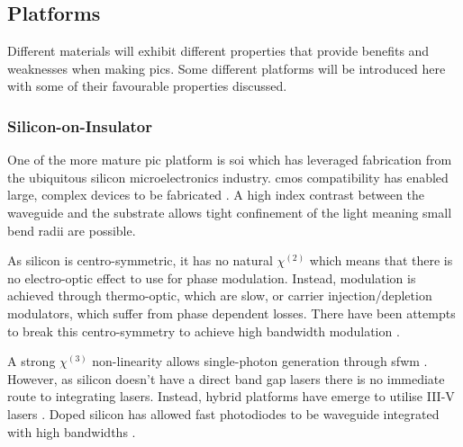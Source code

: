 

\subsection{Platforms}

Different materials will exhibit different properties that provide benefits and weaknesses when making \acp{pic}. Some different platforms will be introduced here with some of their favourable properties discussed.

\subsubsection*{Silicon-on-Insulator}

One of the more mature \ac{pic} platform is \ac{soi} which has leveraged fabrication from the ubiquitous silicon microelectronics industry. \Ac{cmos} compatibility has enabled large, complex devices to be fabricated \cite{wang2019integrated}. A high index contrast between the waveguide and the substrate allows tight confinement of the light meaning small bend radii are possible. 

As silicon is centro-symmetric, it has no natural $\chi^{(2)}$ which means that there is no electro-optic effect to use for phase modulation. Instead, modulation is achieved through thermo-optic, which are slow, or carrier injection/depletion modulators, which suffer from phase dependent losses. There have been attempts to break this centro-symmetry to achieve high bandwidth modulation \cite{cazzanelli2016second, castellan2019origin}.

A strong $\chi^{(3)}$ non-linearity allows single-photon generation through \ac{sfwm} \cite{SilverstoneThesis}. However, as silicon doesn't have a direct band gap lasers there is no immediate route to integrating lasers. Instead, hybrid platforms have emerge to utilise III-V lasers \cite{Fan2017, Agnesi2019}. Doped silicon has allowed fast photodiodes to be waveguide integrated with high bandwidths \cite{raffaelli2018generation}.


